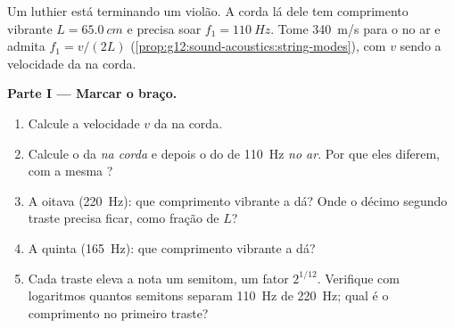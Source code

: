 \begin{problem}
\label{pb:g12:sound-acoustics:1}
Um luthier está terminando um violão. A corda lá dele tem comprimento
vibrante $L = \qty{65.0}{cm}$ e precisa soar $f_1 = \qty{110}{Hz}$. Tome
\qty{340}{m/s} para o  no ar e admita $f_1 = v/(2L)$
(\cref{prop:g12:sound-acoustics:string-modes}), com $v$ sendo a
velocidade da  na corda.

\medskip
\noindent\textbf{Parte I --- Marcar o braço.}
\begin{enumerate}
  \item Calcule a velocidade $v$ da  na corda.
  \item Calcule o  da  \emph{na corda} e
        depois o  do  de \qty{110}{Hz} \emph{no
        ar}. Por que eles diferem, com a mesma ?
  \item A oitava (\qty{220}{Hz}): que comprimento vibrante a dá? Onde o
        décimo segundo traste precisa ficar, como fração de $L$?
  \item A quinta (\qty{165}{Hz}): que comprimento vibrante a dá?
  \item Cada traste eleva a nota um semitom, um fator $2^{1/12}$.
        Verifique com logaritmos quantos semitons separam \qty{110}{Hz}
        de \qty{220}{Hz}; qual é o comprimento no primeiro traste?
\end{enumerate}


\end{problem}

